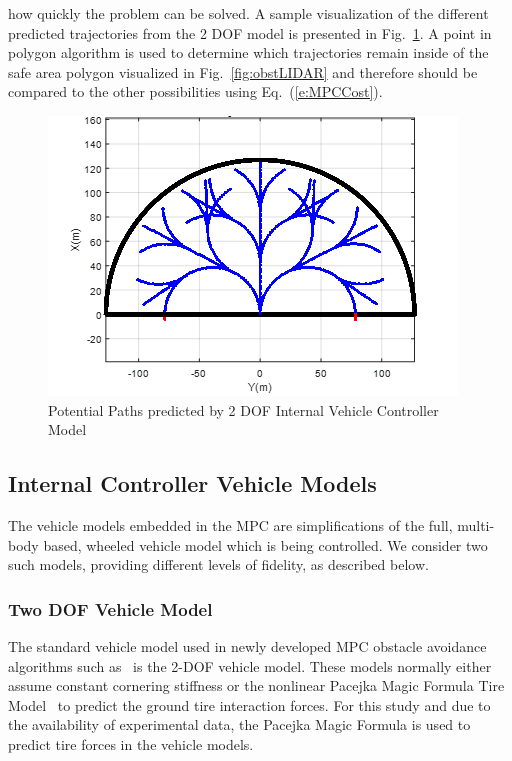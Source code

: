 \documentclass[12pt,twocolumn]{article}
\newcommand{\CHRONO}{{\sffamily{{Chrono}}}}
\begin{document}
how quickly the problem can be solved. A sample visualization of the different predicted trajectories from the 2 DOF model is presented in Fig.~\ref{fig:PossiblePaths}. A point in polygon algorithm is used to determine which trajectories remain inside of the safe area polygon visualized in Fig.~\ref{fig:obstLIDAR} and therefore should be compared to the other possibilities using Eq.~(\ref{e:MPCCost}).

\begin{figure}
	\centering
	\includegraphics[width=\columnwidth]{Figs/PathPossibilities.png}
	\caption{\small Potential Paths predicted by 2 DOF Internal Vehicle Controller Model}  
	\label{fig:PossiblePaths}
\end{figure}



\subsection{Internal Controller Vehicle Models}\label{ss:IntModel}

The vehicle models embedded in the MPC are simplifications of the full, multi-body based, {\CHRONO} wheeled vehicle model which is being controlled.  We consider two such models, providing different levels of fidelity, as described below.


\subsubsection{Two DOF Vehicle Model}\label{sss:2DOFModel}
The standard vehicle model used in newly developed MPC obstacle avoidance algorithms such as~\cite{ModelFidelity2016} is the 2-DOF vehicle model. These models normally either assume constant cornering stiffness or the nonlinear Pacejka Magic Formula Tire Model~\cite{foo} to predict the ground tire interaction forces. For this study and due to the availability of experimental data, the Pacejka Magic Formula is used to predict tire forces in the vehicle models.   
\end{document}

